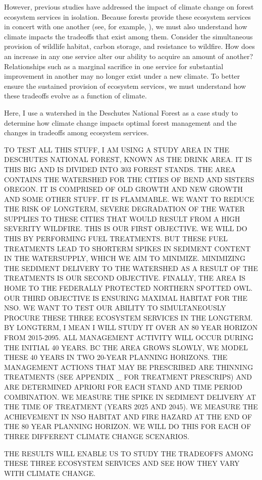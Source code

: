However, previous studies have addressed the impact of climate change on forest ecosystem services in isolation. Because forests provide these ecosystem services in concert with one another (see, for example, \cite{toth2009finding}), we must also understand how climate impacts the tradeoffs that exist among them. Consider the simultaneous provision of wildlife habitat, carbon storage, and resistance to wildfire. How does an increase in any one service alter our ability to acquire an amount of another? Relationships such as a marginal sacrifice in one service for substantial improvement in another may no longer exist under a new climate. To better ensure the sustained provision of ecosystem services, we must understand how these tradeoffs evolve as a function of climate.

Here, I use a watershed in the Deschutes National Forest as a case study to determine how climate change impacts optimal forest management and the changes in tradeoffs among ecosystem services.

TO TEST ALL THIS STUFF, I AM USING A STUDY AREA IN THE DESCHUTES NATIONAL FOREST, KNOWN AS THE DRINK AREA. IT IS THIS BIG AND IS DIVIDED INTO 303 FOREST STANDS. THE AREA CONTAINS THE WATERSHED FOR THE CITIES OF BEND AND SISTERS OREGON. IT IS COMPRISED OF OLD GROWTH AND NEW GROWTH AND SOME OTHER STUFF. IT IS FLAMMABLE. WE WANT TO REDUCE THE RISK OF LONGTERM, SEVERE DEGRADATION OF THE WATER SUPPLIES TO THESE CITIES THAT WOULD RESULT FROM A HIGH SEVERITY WILDFIRE. THIS IS OUR FIRST OBJECTIVE. WE WILL DO THIS BY PERFORMING FUEL TREATMENTS. BUT THESE FUEL TREATMENTS LEAD TO SHORTERM SPIKES IN SEDIMENT CONTENT IN THE WATERSUPPLY, WHICH WE AIM TO MINIMIZE. MINIMIZING THE SEDIMENT DELIVERY TO THE WATERSHED AS A RESULT OF THE TREATMENTS IS OUR SECOND OBJECTIVE. FINALLY, THE AREA IS HOME TO THE FEDERALLY PROTECTED NORTHERN SPOTTED OWL. OUR THIRD OBJECTIVE IS ENSURING MAXIMAL HABITAT FOR THE NSO. WE WANT TO TEST OUR ABILITY TO SIMULTANEOUSLY PROCURE THESE THREE ECOSYSTEM SERVICES IN THE LONGTERM. BY LONGTERM, I MEAN I WILL STUDY IT OVER AN 80 YEAR HORIZON FROM 2015-2095. ALL MANAGEMENT ACTIVITY WILL OCCUR DURING THE INITIAL 40 YEARS. BC THE AREA GROWS SLOWLY, WE MODEL THESE 40 YEARS IN TWO 20-YEAR PLANNING HORIZONS. THE MANAGEMENT ACTIONS THAT MAY BE PRESCRIBED ARE THINNING TREATMENTS (SEE APPENDIX \_ FOR TREATMENT PRESCRIPS) AND ARE DETERMINED APRIORI FOR EACH STAND AND TIME PERIOD COMBINATION. WE MEASURE THE SPIKE IN SEDIMENT DELIVERY AT THE TIME OF TREATMENT (YEARS 2025 AND 2045). WE MEASURE THE ACHIEVEMENT IN NSO HABITAT AND FIRE HAZARD AT THE END OF THE 80 YEAR PLANNING HORIZON. WE WILL DO THIS FOR EACH OF THREE DIFFERENT CLIMATE CHANGE SCENARIOS.

THE RESULTS WILL ENABLE US TO STUDY THE TRADEOFFS AMONG THESE THREE ECOSYSTEM SERVICES AND SEE HOW THEY VARY WITH CLIMATE CHANGE.